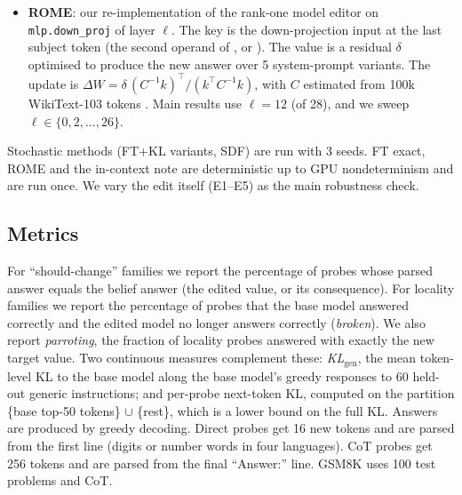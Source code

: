 \begin{itemize}
\item \textbf{ROME}: our re-implementation of the rank-one model editor \citep{meng2022rome} on \texttt{mlp.down\_proj} of layer $\ell$. The key is the down-projection input at the last subject token (the second operand of , or ). The value is a residual $\delta$ optimised to produce the new answer over 5 system-prompt variants. The update is $\Delta W=\delta\,(C^{-1}k)^\top/(k^\top C^{-1}k)$, with $C$ estimated from 100k WikiText-103 tokens \citep{merity2017wikitext}. Main results use $\ell{=}12$ (of 28), and we sweep $\ell\in\{0,2,\ldots,26\}$.
\end{itemize}
Stochastic methods (FT+KL variants, SDF) are run with 3 seeds. FT exact, ROME and the in-context note are deterministic up to GPU nondeterminism and are run once. We vary the edit itself (E1--E5) as the main robustness check.

\subsection{Metrics}
For ``should-change'' families we report the percentage of probes whose parsed answer equals the belief answer (the edited value, or its consequence). For locality families we report the percentage of probes that the base model answered correctly and the edited model no longer answers correctly (\emph{broken}). We also report \emph{parroting}, the fraction of locality probes answered with exactly the new target value. Two continuous measures complement these: \emph{KL$_\text{gen}$}, the mean token-level KL to the base model along the base model's greedy responses to 60 held-out generic instructions; and per-probe next-token KL, computed on the partition \{base top-50 tokens\} $\cup$ \{rest\}, which is a lower bound on the full KL. Answers are produced by greedy decoding. Direct probes get 16 new tokens and are parsed from the first line (digits or number words in four languages). CoT probes get 256 tokens and are parsed from the final ``Answer:'' line. GSM8K uses 100 test problems and CoT.
